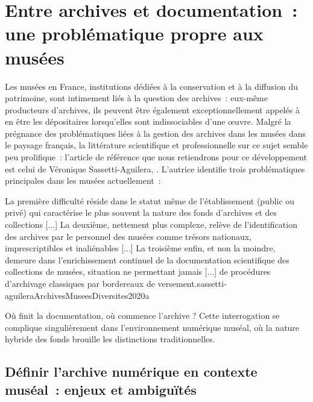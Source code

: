 \section{Entre archives et documentation~: une problématique propre aux musées}

Les musées en France, institutions dédiées à la conservation et à la diffusion du patrimoine, sont intimement liés à la question des archives~: eux-même producteurs d'archives, ils peuvent être également exceptionnellement appelés à en être les dépositaires lorsqu'elles sont indissociables d'une œuvre. Malgré la prégnance des problématiques liées à la gestion des archives dans les musées dans le paysage français, la littérature scientifique et professionnelle sur ce sujet semble peu prolifique~: l'article de référence que nous retiendrons pour ce développement est celui de Véronique Sassetti-Aguilera, \textit{}. L'autrice identifie trois problématiques principales dans les musées actuellement~: 

\begin{myquote}
	{La première difficulté réside dans le statut même de l'établissement (public ou privé) qui caractérise le plus souvent la nature des fonds d'archives et des collections [...] La deuxième, nettement plus complexe, relève de l'identification des archives par le personnel des musées comme trésors nationaux, imprescriptibles et inaliénables [...] La troisième enfin, et non la moindre, demeure dans l'enrichissement continuel de la documentation scientifique des collections de musées, situation ne permettant jamais [...] de procédures d'archivage classiques par bordereaux de versement.}{sassetti-aguileraArchivesMuseesDiversites2020a}
\end{myquote}
Où finit la documentation, où commence l'archive ? Cette interrogation se complique singulièrement dans l'environnement numérique muséal, où la nature hybride des fonds brouille les distinctions traditionnelles.

\subsection{Définir l’archive numérique en contexte muséal~: enjeux et ambiguïtés}

